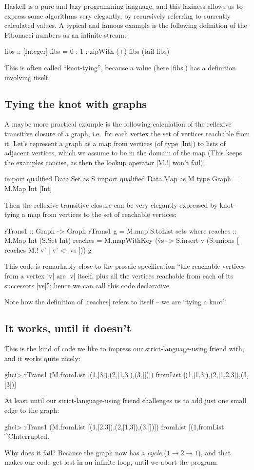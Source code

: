 \documentclass[manuscript,anonymous,screen,acmsmall]{acmart}
\begin{document}
Haskell is a pure and lazy programming language, and this laziness allows us to express some algorithms very elegantly, by recursively referring to currently calculated values. A typical and famous example is the following definition of the Fibonacci numbers as an infinite stream:
\begin{code}
fibs :: [Integer]
fibs = 0 : 1 : zipWith (+) fibs (tail fibs)
\end{code}
This is often called “knot-tying”, because a value (here |fibs|) has a definition involving itself.

\subsection{Tying the knot with graphs}

A maybe more practical example is the following calculation of the reflexive transitive closure of a graph, i.e.\ for each vertex the set of vertices reachable from it. Let's represent a graph as a map from vertices (of type |Int|) to lists of adjacent vertices, which we assume to be in the domain of the map (This keeps the examples concise, as then the lookup operator |M.!| won't fail):
\begin{code}
import qualified Data.Set as S
import qualified Data.Map as M
type Graph = M.Map Int [Int]
\end{code}

Then the reflexive transitive closure can be very elegantly expressed by knot-tying a map from vertices to the set of reachable vertices:
\begin{code}
rTrans1 :: Graph -> Graph
rTrans1 g = M.map S.toList sets
  where
    reaches :: M.Map Int (S.Set Int)
    reaches = M.mapWithKey (\v vs -> S.insert v (S.unions [ reaches M.! v' | v' <- vs ])) g
\end{code}
This code is remarkably close to the prosaic specification “the reachable vertices from a vertex |v| are |v| itself, plus all the vertices reachable from each of its successors |vs|”; hence we can call this code declarative.

Note how the definition of |reaches| refers to itself -- we are “tying a knot”.

\subsection{It works, until it doesn't}

This is the kind of code we like to impress our strict-language-using friend with, and it works quite nicely:
\begin{code}
ghci> rTrans1 (M.fromList [(1,[3]),(2,[1,3]),(3,[])])
fromList [(1,[1,3]),(2,[1,2,3]),(3,[3])]
\end{code}
%
At least until our strict-language-using friend challenges us to add just one small edge to the graph:
\begin{code}
ghci> rTrans1 (M.fromList [(1,[2,3]),(2,[1,3]),(3,[])])
fromList [(1,fromList ^CInterrupted.
\end{code}
Why does it fail? Because the graph now has a \emph{cycle} ($1 \to 2 \to 1$), and that makes our code get lost in an infinite loop, until we abort the program.
\end{document}
